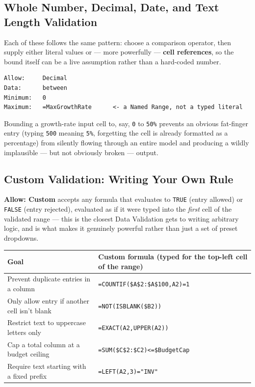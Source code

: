 \documentclass[11pt,a4paper]{article}
\begin{document}
\subsection{Whole Number, Decimal, Date, and Text Length Validation}

Each of these follows the same pattern: choose a comparison operator, then supply either literal values or --- more powerfully --- \textbf{cell references}, so the bound itself can be a live assumption rather than a hard-coded number.

\begin{lstlisting}[style=excelstyle, caption={A Decimal validation rule referencing a live cell as its upper bound, instead of a hard-coded number}]
Allow:     Decimal
Data:      between
Minimum:   0
Maximum:   =MaxGrowthRate      <- a Named Range, not a typed literal
\end{lstlisting}

\begin{financeapp}
Bounding a growth-rate input cell to, say, \texttt{0} to \texttt{50\%} prevents an obvious fat-finger entry (typing \texttt{500} meaning \texttt{5\%}, forgetting the cell is already formatted as a percentage) from silently flowing through an entire model and producing a wildly implausible --- but not obviously broken --- output.
\end{financeapp}

\subsection{Custom Validation: Writing Your Own Rule}
\label{sec:dvcustom}

\textbf{Allow: Custom} accepts any formula that evaluates to \texttt{TRUE} (entry allowed) or \texttt{FALSE} (entry rejected), evaluated as if it were typed into the \emph{first} cell of the validated range --- this is the closest Data Validation gets to writing arbitrary logic, and is what makes it genuinely powerful rather than just a set of preset dropdowns.

\begin{center}
\begin{tabular}{@{}L{4.6cm}L{6.6cm}@{}}
\toprule
\textbf{Goal} & \textbf{Custom formula (typed for the top-left cell of the range)} \\
\midrule
Prevent duplicate entries in a column & \texttt{=COUNTIF(\$A\$2:\$A\$100,A2)=1} \\
Only allow entry if another cell isn't blank & \texttt{=NOT(ISBLANK(\$B2))} \\
Restrict text to uppercase letters only & \texttt{=EXACT(A2,UPPER(A2))} \\
Cap a total column at a budget ceiling & \texttt{=SUM(\$C\$2:\$C2)<=\$BudgetCap} \\
Require text starting with a fixed prefix & \texttt{=LEFT(A2,3)="INV"} \\
\bottomrule
\end{tabular}
\end{center}
\end{document}

